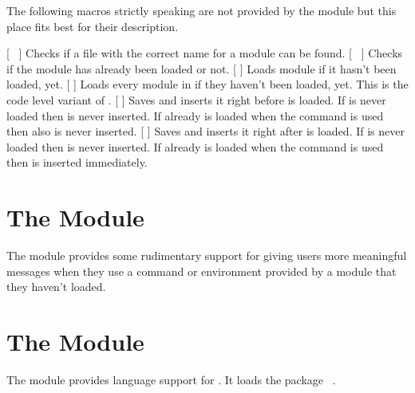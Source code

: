 \documentclass{chemmacros-manual}
\begin{document}
The following macros strictly speaking are not provided by the
 module but this place fits best for their description.
\begin{commands}
  \expandable{}[\TF\ 
   ]
    Checks if a file with the correct name for a module  can be
    found.
  \expandable{}[\TF\ 
   ]
    Checks if the module  has already been loaded or not.
  [ ]
    Loads module  if it hasn't been loaded, yet.
  [ ]
    Loads every module in  if they haven't been
    loaded, yet. This is the code level variant of .
  [  ]
    Saves  and inserts it right before
     is loaded.  If  is never loaded then
     is never inserted.  If  already is loaded when
    the command is used then  also is never inserted.
  [  ]
    Saves  and inserts it right after
     is loaded.  If  is never loaded then
     is never inserted.  If  already is loaded when
    the command is used then  is inserted immediately.
\end{commands}

\section{The  Module}\label{sec:errorcheck-module}
The  module provides some rudimentary
support for giving users more meaningful messages when they use a command or
environment provided by a module that they haven't loaded.

\section{The  Module}\label{sec:lang-module}

The  module provides language support for \chemmacros.  It
loads the package ~\cite{pkg:translations}.
\end{document}
